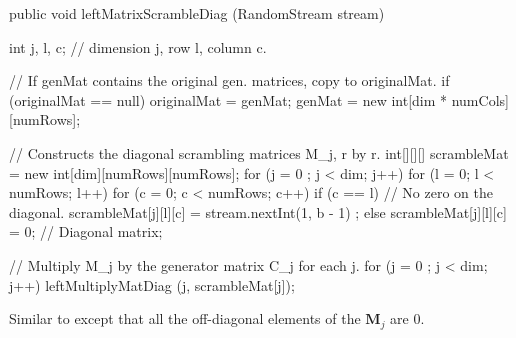 \begin{code}

   public void leftMatrixScrambleDiag (RandomStream stream) \begin{hide} {
      int j, l, c;  // dimension j, row l, column c.

      // If genMat contains the original gen. matrices, copy to originalMat.
      if (originalMat == null) {
         originalMat = genMat;
         genMat = new int[dim * numCols][numRows];
      }

      // Constructs the diagonal scrambling matrices M_j, r by r.
      int[][][] scrambleMat = new int[dim][numRows][numRows];
      for (j = 0 ; j < dim; j++) {
         for (l = 0; l < numRows; l++) {
            for (c = 0; c < numRows; c++) {
               if (c == l)                   // No zero on the diagonal.
                  scrambleMat[j][l][c] = stream.nextInt(1, b - 1) ;
               else
                  scrambleMat[j][l][c] = 0;  // Diagonal matrix;
            }
         }
      }

      // Multiply M_j by the generator matrix C_j for each j.
      for (j = 0 ; j < dim; j++) leftMultiplyMatDiag (j, scrambleMat[j]);
   }\end{hide}
\end{code}
 \begin{tabb}
   Similar to  except that all the
   off-diagonal elements of the $\mathbf{M}_j$ are 0.
\end{tabb}
\begin{htmlonly}
\end{htmlonly}
